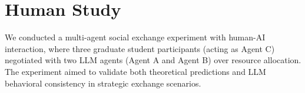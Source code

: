     





\section{Human Study}
\label{sec:human}
We conducted a multi-agent social exchange experiment with human-AI interaction, where three graduate student participants (acting as Agent C) negotiated with two LLM agents (Agent A and Agent B) over resource allocation. The experiment aimed to validate both theoretical predictions and LLM behavioral consistency in strategic exchange scenarios.

